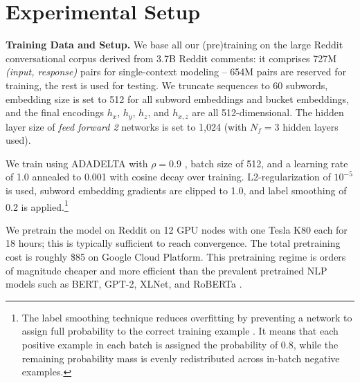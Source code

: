 \documentclass[11pt,a4paper]{article}
\begin{document}
%
 
\section{Experimental Setup}
\label{s:exp}


\noindent \textbf{Training Data and Setup.} 
We base all our (pre)training on the large Reddit conversational corpus \cite{Henderson:2019arxiv} derived from 3.7B Reddit comments: it comprises 727M \textit{(input, response)} pairs for single-context modeling -- 654M pairs are reserved for training, the rest is used for testing. We truncate sequences to 60 subwords, embedding size is set to 512 for all subword embeddings and bucket embeddings, and the final encodings $h_x$, $h_y$, $h_z$, and $h_{x,z}$ are all 512-dimensional. The hidden layer size of \textit{feed forward 2} networks is set to 1,024 (with $N_f=3$ hidden layers used).

We train using ADADELTA with $\rho = 0.9$ \cite{Zeiler:2012ada}, batch size of 512, and a learning rate of 1.0 annealed to 0.001 with cosine decay over training. L2-regularization of $10^{-5}$ is used, subword embedding gradients are clipped to 1.0, and label smoothing of 0.2 is applied.\footnote{The label smoothing technique \cite{Szegedy:2016cvpr} reduces overfitting by preventing a network to assign full probability to the correct training example \cite{Pereyra:2017arxiv}. It means that each positive example in each batch is assigned the probability of 0.8, while the remaining probability mass is evenly redistributed across in-batch negative examples.} 



We pretrain the model on Reddit on 12 GPU nodes with one Tesla K80 each for 18 hours; this is typically sufficient to reach convergence. The total pretraining cost is roughly \$85 on Google Cloud Platform. This pretraining regime is orders of magnitude cheaper and more efficient than the prevalent pretrained NLP models such as BERT, GPT-2, XLNet, and RoBERTa \cite{Strubell:2019acl}.
\end{document}
